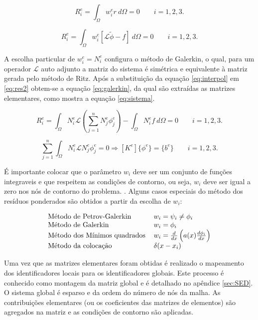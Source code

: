 \documentclass[
    12pt,               %
    openright,          %
    oneside,
    a4paper,            %
    english,            %
    french,             %
    spanish,            %
    brazil              %
    ]{abntex2}
\begin{document}
\begin{equation}
\label{eq:res1}
R_i^e = \int_{\Omega}{w_i^e r \ d\Omega} = 0 \qquad i = 1,2,3.
\end{equation}

\begin{equation}
\label{eq:res2}
R_i^e = \int_{\Omega}{w_i^e [\mathcal{L} \tilde{\phi} - f] \ d\Omega} = 0  \qquad i = 1,2,3.
\end{equation}  


A escolha particular de $w_i^e = N^e_i$ configura o método de Galerkin, o qual, para um operador $\mathcal{L}$ auto adjunto a matriz do sistema é simétrica e equivalente à matriz gerada pelo método de Ritz. Após a substituição da equação \ref{eq:interpol} em \ref{eq:res2} obtem-se a equação \ref{eq:galerkin}, da qual são extraídas as matrizes elementares, como mostra a equação \ref{eq:sistema}.


\begin{equation}
\label{eq:galerkin}
R_i^e = \int_{\Omega}{N_i^e \mathcal{L} \left( \sum_{j=1}^{n}{N_j^e \phi_j^e} \right) } - \int_{\Omega}{N^e_i f \ d \Omega} = 0  \qquad i = 1,2,3.
\end{equation} 


\begin{equation}
\label{eq:sistema}
\sum_{j=1}^{n}\int_{\Omega}{N_i^e \mathcal{L} N_j^e  \phi_j^e  } = 0 \Rightarrow [K^e]\{\phi^e\} = \{b^e\} \qquad i = 1,2,3.
\end{equation}  

É importante colocar que o parâmetro $w_i$ deve ser um conjunto de funções integraveis e que respeitem as condições de contorno, ou seja, $w_i$ deve ser igual a zero nos nós de contorno do problema.
\cite{reddy}. Alguns casos especiais do método dos resíduos ponderados são obtidos a partir da escolha de $w_i$:

\begin{equation}
\label{eq:metPond}
\begin{tabular}{ l l }
Método de Petrov-Galerkin & $ w_i = \psi_i \neq \phi_i $ \\ 
Método de Galerkin & $ w_i = \phi_i $\\  
Método dos Mínimos quadrados & $ w_i = \frac{d}{dx} \left(a(x)\frac{d \phi_i}{dx}\right) $ \\ 
Método da colocação & $ \delta(x - x_i)  $ 
\end{tabular}
\end{equation}

Uma vez que as matrizes elementares foram obtidas é realizado o mapeamento dos identificadores locais para os identificadores globais. Este processo é conhecido como montagem da matriz global e é detalhado no apêndice \ref{sec:SED}. O sistema global é esparso e da ordem do número de nós da malha. As contribuições elementares (ou os coeficientes das matrizes de elementos) são agregados na matriz e as condições de contorno são aplicadas.
\end{document}
